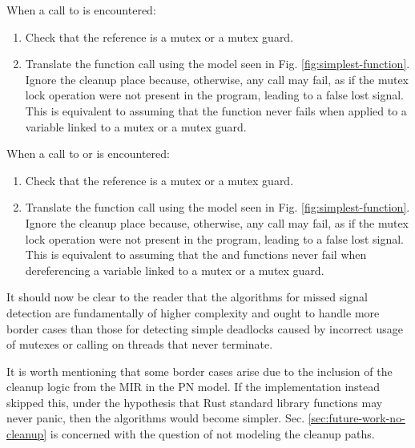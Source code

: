 When a call to  is encountered:

\begin{enumerate}
  \item Check that the  reference is a mutex or a mutex guard.
  \item Translate the function call using the model seen in Fig. \ref{fig:simplest-function}.
        Ignore the cleanup place because, otherwise, any call may fail,
        as if the mutex lock operation
        were not present in the program, leading to a false lost signal.
        This is equivalent to assuming that the  function never fails
        when applied to a variable linked to a mutex or a mutex guard.
\end{enumerate}

When a call to 
or  is encountered:

\begin{enumerate}
  \item Check that the  reference is a mutex or a mutex guard.
  \item Translate the function call using the model seen in Fig. \ref{fig:simplest-function}.
        Ignore the cleanup place because, otherwise, any call may fail,
        as if the mutex lock operation
        were not present in the program, leading to a false lost signal.
        This is equivalent to assuming that the 
        and  functions never fail
        when dereferencing a variable linked to a mutex or a mutex guard.
\end{enumerate}

It should now be clear to the reader that the algorithms for missed signal detection are
fundamentally of higher complexity and ought to handle more border cases than
those for detecting simple deadlocks caused by incorrect usage of mutexes or
calling  on threads that never terminate.

It is worth mentioning that some border cases arise
due to the inclusion of the cleanup logic
from the \acrshort{MIR} in the \acrshort{PN} model.
If the implementation instead skipped this,
under the hypothesis that Rust standard library functions may never panic,
then the algorithms would become simpler.
Sec. \ref{sec:future-work-no-cleanup} is concerned with
the question of not modeling the cleanup paths.